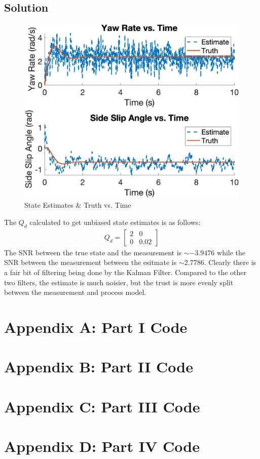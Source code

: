 \documentclass{article}
\begin{document}
\subsection*{Solution}
\begin{figure}[H]
    \centering
    \includegraphics[width=0.75\linewidth]{../figures/p4d_kf.png}
    \caption{State Estimates \& Truth vs. Time}\label{fig:p4d_kf}
\end{figure}
The $Q_d$ calculated to get unbiased state estimates is as follows:
\begin{gather*}
    Q_d = \begin{bmatrix}
        2 & 0\\
        0 & 0.02
    \end{bmatrix}
\end{gather*}
The SNR between the true state and the measurement is $\sim -3.9476$ while the SNR between the measurement between the esitmate is $\sim 2.7786$.  Clearly there is a fair bit of filtering being done by the Kalman Filter.  Compared to the other two filters, the estimate is much noisier, but the trust is more evenly split between the measurement and process model.

\section*{Appendix A: Part I Code}


\section*{Appendix B: Part II Code}


\section*{Appendix C: Part III Code}


\section*{Appendix D: Part IV Code}

\end{document}
